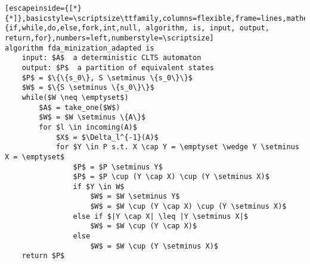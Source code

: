 \renewcommand{\ttdefault}{pcr}
\begin{lstlisting}[escapeinside={[*}{*]},basicstyle=\scriptsize\ttfamily,columns=flexible,frame=lines,mathescape=true,xleftmargin=3.0ex,keywordstyle=\textbf,morekeywords={if,while,do,else,fork,int,null, algorithm, is, input, output, return,for},numbers=left,numberstyle=\scriptsize]
algorithm fda_minization_adapted is
	input: $A$  a deterministic CLTS automaton
	output: $P$  a partition of equivalent states
	$P$ = $\{\{s_0\}, S \setminus \{s_0\}\}$
	$W$ = $\{S \setminus \{s_0\}\}$
	while($W \neq \emptyset$)
		$A$ = take_one($W$)
		$W$ = $W \setminus \{A\}$
		for $l \in incoming(A)$
			$X$ = $\Delta_l^{-1}(A)$
			for $Y \in P s.t. X \cap Y = \emptyset \wedge Y \setminus X = \emptyset$
				$P$ = $P \setminus Y$
				$P$ = $P \cup (Y \cap X) \cup (Y \setminus X)$				
				if $Y \in W$
					$W$ = $W \setminus Y$				
					$W$ = $W \cup (Y \cap X) \cup (Y \setminus X)$		
				else if $|Y \cap X| \leq |Y \setminus X|$							
					$W$ = $W \cup (Y \cap X)$						
				else
					$W$ = $W \cup (Y \setminus X)$						
	return $P$
\end{lstlisting}